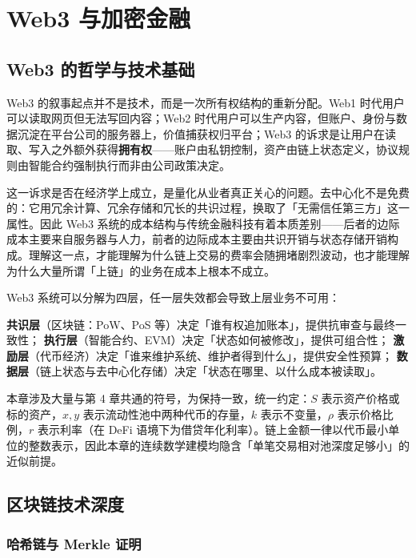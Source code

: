 \chapter{Web3 与加密金融}

\section{Web3 的哲学与技术基础}

Web3 的叙事起点并不是技术，而是一次所有权结构的重新分配。Web1 时代用户可以读取网页但无法写回内容；Web2 时代用户可以生产内容，但账户、身份与数据沉淀在平台公司的服务器上，价值捕获权归平台；Web3 的诉求是让用户在读取、写入之外额外获得\textbf{拥有权}——账户由私钥控制，资产由链上状态定义，协议规则由智能合约强制执行而非由公司政策决定。

这一诉求是否在经济学上成立，是量化从业者真正关心的问题。去中心化不是免费的：它用冗余计算、冗余存储和冗长的共识过程，换取了「无需信任第三方」这一属性。因此 Web3 系统的成本结构与传统金融科技有着本质差别——后者的边际成本主要来自服务器与人力，前者的边际成本主要由共识开销与状态存储开销构成。理解这一点，才能理解为什么链上交易的费率会随拥堵剧烈波动，也才能理解为什么大量所谓「上链」的业务在成本上根本不成立。

\begin{keybox}
Web3 系统可以分解为四层，任一层失效都会导致上层业务不可用：

\textbf{共识层}（区块链：PoW、PoS 等）决定「谁有权追加账本」，提供抗审查与最终一致性；
\textbf{执行层}（智能合约、EVM）决定「状态如何被修改」，提供可组合性；
\textbf{激励层}（代币经济）决定「谁来维护系统、维护者得到什么」，提供安全性预算；
\textbf{数据层}（链上状态与去中心化存储）决定「状态在哪里、以什么成本被读取」。
\end{keybox}

\begin{notebox}[本节的记号约定]
本章涉及大量与第 4 章共通的符号，为保持一致，统一约定：$S$ 表示资产价格或标的资产，$x,y$ 表示流动性池中两种代币的存量，$k$ 表示不变量，$\rho$ 表示价格比例，$r$ 表示利率（在 DeFi 语境下为借贷年化利率）。链上金额一律以代币最小单位的整数表示，因此本章的连续数学建模均隐含「单笔交易相对池深度足够小」的近似前提。
\end{notebox}

\section{区块链技术深度}

\subsection{哈希链与 Merkle 证明}

